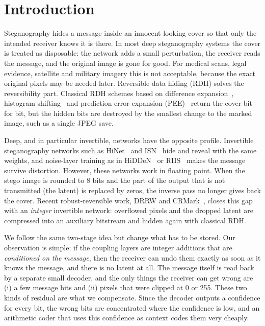 \section{Introduction}
Steganography hides a message inside an innocent-looking cover so that only the intended receiver knows it is there.
In most deep steganography systems the cover is treated as disposable: the network adds a small perturbation, the
receiver reads the message, and the original image is gone for good. For medical scans, legal evidence, satellite and
military imagery this is not acceptable, because the exact original pixels may be needed later. Reversible data hiding
(RDH) solves the reversibility part. Classical RDH schemes based on difference expansion~\cite{tian2003de}, histogram
shifting~\cite{ni2006hs} and prediction-error expansion (PEE)~\cite{thodi2007pee,sachnev2009,ou2013ppee} return the cover
bit for bit, but the hidden bits are destroyed by the smallest change to the marked image, such as a single JPEG save.

Deep, and in particular invertible, networks have the opposite profile. Invertible steganography networks such as
HiNet~\cite{jing2021hinet} and ISN~\cite{lu2021isn} hide and reveal with the same weights, and noise-layer training as in
HiDDeN~\cite{zhu2018hidden} or RIIS~\cite{xu2022riis} makes the message survive distortion. However, these networks work in
floating point. When the stego image is rounded to 8 bits and the part of the output that is not transmitted (the
latent) is replaced by zeros, the inverse pass no longer gives back the cover. Recent robust-reversible work, DRRW and
CRMark~\cite{chen2025drrw,chen2025crmark}, closes this gap with an \emph{integer} invertible network: overflowed pixels and
the dropped latent are compressed into an auxiliary bitstream and hidden again with classical RDH.

We follow the same two-stage idea but change what has to be stored. Our observation is simple: if the coupling layers
are integer additions that are \emph{conditioned on the message}, then the receiver can undo them exactly as soon as it
knows the message, and there is no latent at all. The message itself is read back by a separate small decoder, and the
only things the receiver can get wrong are (i) a few message bits and (ii) pixels that were clipped at 0 or 255. These
two kinds of residual are what we compensate. Since the decoder outputs a confidence for every bit, the wrong bits are
concentrated where the confidence is low, and an arithmetic coder that uses this confidence as context codes them very
cheaply.

